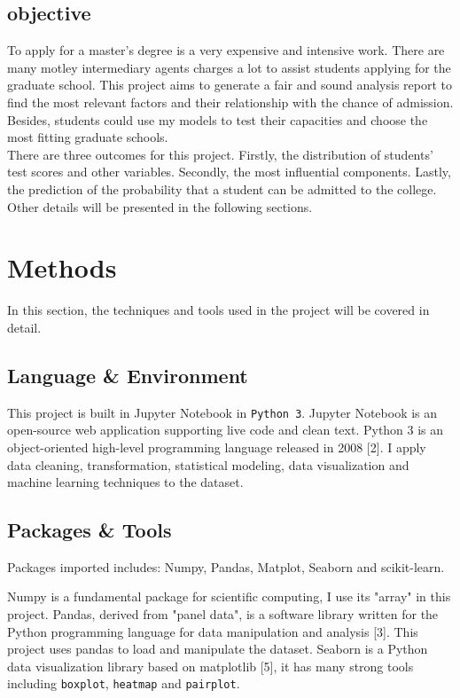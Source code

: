 \documentclass[12pt]{article}
\begin{document}
\begin{sloppypar}
\subsection{objective}

To apply for a master's degree is a very expensive and intensive work. There are many motley intermediary agents charges a lot to assist students applying for the graduate school. This project aims to generate a fair and sound analysis report to find the most relevant factors and their relationship with the chance of admission. Besides, students could use my models to test their capacities and choose the most fitting graduate schools.\\
There are three outcomes for this project. Firstly, the distribution of students' test scores and other variables. Secondly, the most influential components. Lastly, the prediction of the probability that a student can be admitted to the college. Other details will be presented in the following sections. 

\section{Methods}

In this section, the techniques and tools used in the project will be covered in detail. 

\subsection{Language \& Environment}

This project is built in Jupyter Notebook in \texttt{Python 3}. Jupyter Notebook is an open-source web application supporting live code and clean text. Python 3 is an object-oriented high-level programming language released in 2008 [2]. I apply data cleaning, transformation, statistical modeling, data visualization and machine learning techniques to the dataset.
\subsection{Packages \& Tools}

Packages imported includes: Numpy, Pandas, Matplot, Seaborn and scikit-learn.

Numpy is a fundamental package for scientific computing, I use its "array" in this project. Pandas, derived from "panel data", is a software library written for the Python programming language for data manipulation and analysis [3]. This project uses pandas to load and manipulate the dataset. Seaborn is a Python data visualization library based on matplotlib [5], it has many strong tools including \texttt{boxplot}, \texttt{heatmap} and \texttt{pairplot}.


\end{sloppypar}
\end{document}
